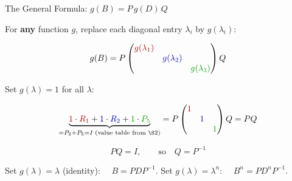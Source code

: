 \documentclass[10pt]{beamer}
\theoremstyle{definition}
\newcommand{\x}[1]{\alert{\textbf{#1}}}
\newcommand{\rd}[1]{{\color{red!70!black}#1}}
\newcommand{\bl}[1]{{\color{blue!70!black}#1}}
\newcommand{\gn}[1]{{\color{green!60!black}#1}}
\begin{document}
\begin{frame}[shrink=10]{The General Formula: $g(B) = P\,g(D)\,Q$}

For \x{any} function $g$, replace each diagonal entry $\lambda_i$ by $g(\lambda_i)$:

$$g(B) = P\begin{pmatrix}\rd{g(\lambda_1)}&&\\&\bl{g(\lambda_2)}&\\&&\gn{g(\lambda_3)}\end{pmatrix}Q$$

\vfill\pause

Set $g(\lambda) = 1$ for all $\lambda$:

$$\underbrace{\rd{1}\cdot\rd{R_1} + \bl{1}\cdot\bl{R_2} + \gn{1}\cdot\gn{P_5}}_{= P_2 + P_5 = I\;\text{(value table from \S2)}} = P\begin{pmatrix}\rd{1}&&\\&\bl{1}&\\&&\gn{1}\end{pmatrix}Q = PQ$$

\vfill

$$\boxed{PQ = I, \qquad\text{so}\quad Q = P^{-1}}$$

\vfill\pause

Set $g(\lambda) = \lambda$ (identity): $\quad B = PDP^{-1}$. \quad Set $g(\lambda) = \lambda^n$: $\quad B^n = PD^nP^{-1}$.

\end{frame}
\end{document}
